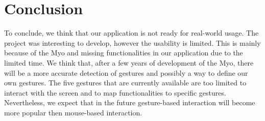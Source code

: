 \documentclass{article}
\begin{document}
\section{Conclusion}
To conclude, we think that our application is not ready for real-world usage. The project was interesting to develop, however the usability is limited. This is mainly because of the Myo and missing functionalities in our application due to the limited time. We think that, after a few years of development of the Myo, there will be a more accurate detection of gestures and possibly a way to define our own gestures. The five gestures that are currently available are too limited to interact with the screen and to map functionalities to specific gestures. Nevertheless, we expect that in the future gesture-based interaction will become more popular then mouse-based interaction.
\end{document}
